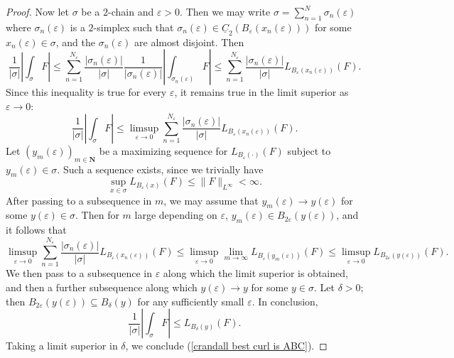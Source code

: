 \documentclass[reqno,11pt]{amsart}
\newcommand{\NN}{\mathbf{N}}
\newcommand{\Chain}{\underline C}
\theoremstyle{definition}
\numberwithin{equation}{section}
\begin{document}
\begin{proof}
Now let $\sigma$ be a $2$-chain and $\varepsilon > 0$.
Then we may write $\sigma = \sum_{n=1}^N \sigma_n(\varepsilon)$ where $\sigma_n(\varepsilon)$ is a $2$-simplex such that $\sigma_n(\varepsilon) \in \Chain_2(B_\varepsilon(x_n(\varepsilon)))$ for some $x_n(\varepsilon) \in \sigma$, and the $\sigma_n(\varepsilon)$ are almost disjoint.
Then 
$$\frac{1}{|\sigma|} \left|\int_\sigma F\right| \leq \sum_{n=1}^{N_\varepsilon} \frac{|\sigma_n(\varepsilon)|}{|\sigma|} \frac{1}{|\sigma_n(\varepsilon)|} \left|\int_{\sigma_n(\varepsilon)} F\right| \leq \sum_{n=1}^{N_\varepsilon} \frac{|\sigma_n(\varepsilon)|}{|\sigma|} L_{B_{\varepsilon}(x_n(\varepsilon))}(F).$$
Since this inequality is true for every $\varepsilon$, it remains true in the limit superior as $\varepsilon \to 0$:
$$\frac{1}{|\sigma|} \left|\int_\sigma F\right| \leq \limsup_{\varepsilon \to 0} \sum_{n=1}^{N_\varepsilon} \frac{|\sigma_n(\varepsilon)|}{|\sigma|} L_{B_{\varepsilon}(x_n(\varepsilon))}(F).$$
Let $(y_m(\varepsilon))_{m \in \NN}$ be a maximizing sequence for $L_{B_\varepsilon(\cdot)}(F)$ subject to $y_m(\varepsilon) \in \sigma$.
Such a sequence exists, since we trivially have
$$\sup_{x \in \sigma} L_{B_\varepsilon(x)}(F) \leq \|F\|_{L^\infty} < \infty.$$
After passing to a subsequence in $m$, we may assume that $y_m(\varepsilon) \to y(\varepsilon)$ for some $y(\varepsilon) \in \sigma$.
Then for $m$ large depending on $\varepsilon$, $y_m(\varepsilon) \in B_{2\varepsilon}(y(\varepsilon))$, and it follows that
$$\limsup_{\varepsilon \to 0} \sum_{n=1}^{N_\varepsilon} \frac{|\sigma_n(\varepsilon)|}{|\sigma|} L_{B_{\varepsilon}(x_n(\varepsilon))}(F) \leq \limsup_{\varepsilon \to 0} \lim_{m \to \infty} L_{B_\varepsilon(y_m(\varepsilon))}(F) \leq \limsup_{\varepsilon \to 0} L_{B_{2\varepsilon}(y(\varepsilon))}(F).$$
We then pass to a subsequence in $\varepsilon$ along which the limit superior is obtained, and then a further subsequence along which $y(\varepsilon) \to y$ for some $y \in \sigma$.
Let $\delta > 0$; then $B_{2\varepsilon}(y(\varepsilon)) \subseteq B_\delta(y)$ for any sufficiently small $\varepsilon$.
In conclusion,
$$\frac{1}{|\sigma|} \left|\int_\sigma F\right| \leq L_{B_\delta(y)}(F).$$
Taking a limit superior in $\delta$, we conclude (\ref{crandall best curl is ABC}).


\end{proof}
\end{document}
